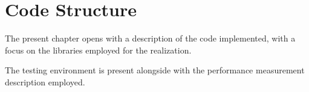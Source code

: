 \chapter{Code Structure}
The present chapter opens with a description of the code implemented, with a focus on the libraries employed for the realization.\par
The testing environment is present alongside with the performance measurement description employed.